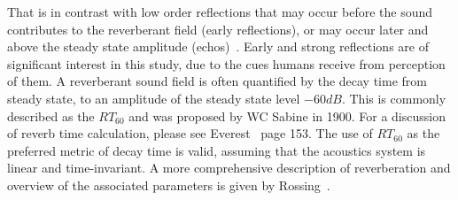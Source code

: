 \documentclass[paper=a4, fontsize=10pt, font=arial]{scrartcl} %
\numberwithin{equation}{section} %
\numberwithin{figure}{section} %
\numberwithin{table}{section} %
\begin{document}
That is in contrast with low order reflections that may occur before the sound contributes to the reverberant field (early reflections), or may occur later and above the steady state amplitude (echos)~\cite{Everest2009}. 
Early and strong reflections are of significant interest in this study, due to the cues humans receive from perception of them. 
A reverberant sound field is often quantified by the decay time from steady state, to an amplitude of the steady state level $-60{dB}$. This is commonly described as the $RT_{60}$ and was proposed by WC Sabine in 1900. For a discussion of reverb time calculation, please see Everest~\cite{Everest2009} page 153.
The use of $RT_{60}$ as the preferred metric of decay time is valid, assuming that the acoustics system is linear and time-invariant.
A more comprehensive description of reverberation and overview of the associated parameters is given by Rossing~\cite{rossing2007springer}. 
\end{document}

